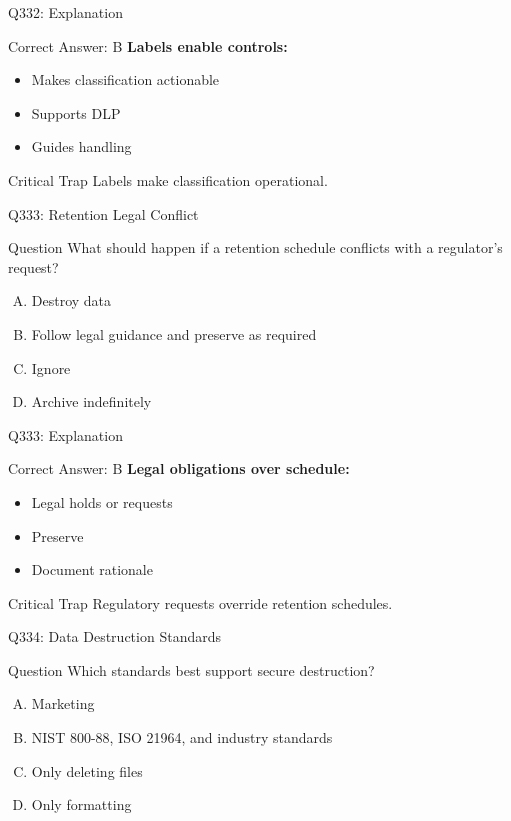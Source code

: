 \documentclass{beamer}
\begin{document}
	\begin{frame}{Q332: Explanation}
		\begin{block}{Correct Answer: B}
			\textbf{Labels enable controls:}
			\begin{itemize}
				\item Makes classification actionable
				\item Supports DLP
				\item Guides handling
			\end{itemize}
		\end{block}
		\begin{alertblock}{Critical Trap}
			Labels make classification operational.
		\end{alertblock}
	\end{frame}
	
	\begin{frame}{Q333: Retention Legal Conflict}
		\begin{block}{Question}
			What should happen if a retention schedule conflicts with a regulator's request?
		\end{block}
		\begin{enumerate}[(A)]
			\item Destroy data
			\item Follow legal guidance and preserve as required
			\item Ignore
			\item Archive indefinitely
		\end{enumerate}
	\end{frame}
	
	\begin{frame}{Q333: Explanation}
		\begin{block}{Correct Answer: B}
			\textbf{Legal obligations over schedule:}
			\begin{itemize}
				\item Legal holds or requests
				\item Preserve
				\item Document rationale
			\end{itemize}
		\end{block}
		\begin{alertblock}{Critical Trap}
			Regulatory requests override retention schedules.
		\end{alertblock}
	\end{frame}
	
	\begin{frame}{Q334: Data Destruction Standards}
		\begin{block}{Question}
			Which standards best support secure destruction?
		\end{block}
		\begin{enumerate}[(A)]
			\item Marketing
			\item NIST 800-88, ISO 21964, and industry standards
			\item Only deleting files
			\item Only formatting
		\end{enumerate}
	\end{frame}
	
\end{document}
